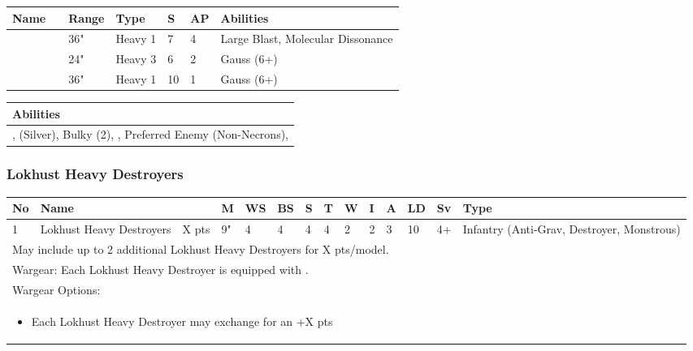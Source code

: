 \noindent
\begin{tabular}{||m{110pt} m{30pt} m{31pt} m{55pt} m{12pt} m{12pt} m{210pt}||}
	\hline
	Name & & Range & Type & S & AP & Abilities \\
	\hline
	\quickref{Enmitic Exterminator} &  & 36" & Heavy 1 & 7 & 4 & Large Blast, Molecular Dissonance \\
	\quickref{Gauss Cannon} &  & 24" & Heavy 3 & 6 & 2 & Gauss (6+) \\
	\quickref{Gauss Destructor} &  & 36" & Heavy 1 & 10 & 1 &  Gauss (6+) \\
	\hline
\end{tabular}

\noindent
\begin{tabular}{||m{532pt}||}
	\hline
	Abilities \\
	\hline
	\quickref{Annihilation Protocols}, \quickref{Awakening Protocols} (Silver), Bulky (2), \quickref{Living Metal}, Preferred Enemy (Non-Necrons), \quickref{Reanimation Protocols} \\
	\hline
\end{tabular}

\newpage
\subsubsection{Lokhust Heavy Destroyers}

\noindent
\begin{tabular}{||m{10pt} m{95pt} m{30pt} m{11pt} m{11pt} m{11pt} m{11pt} m{11pt} m{11pt} m{11pt} m{11pt} m{11pt} m{11pt} m{125pt}||}
	\hline
	No & Name & & M & WS & BS & S & T & W & I & A & LD & Sv & Type \\
	\hline
	1 & Lokhust Heavy Destroyers & X pts & 9" & 4 & 4 & 4 & 4 & 2 & 2 & 3 & 10 & 4+ & Infantry (Anti-Grav, Destroyer, Monstrous) \\
	\hline
	\hline
	\multicolumn{14}{||Z{532 pt}||}{May include up to 2 additional Lokhust Heavy Destroyers for X pts/model.}\\	
	\hline
	\hline
	\multicolumn{14}{||Z{532 pt}||}{Wargear: Each Lokhust Heavy Destroyer is equipped with \quickref{Gauss Destructor}.} \\
	\multicolumn{14}{||Z{532 pt}||}{Wargear Options:} \\	\multicolumn{14}{||Z{532 pt}||}{\begin{itemize}
			\item Each Lokhust Heavy Destroyer may exchange \quickref{Gauss Destructor} for an \quickref{Enmitic Exterminator} \hrulefill +X pts
	\end{itemize}} \\
	\hline
\end{tabular}

